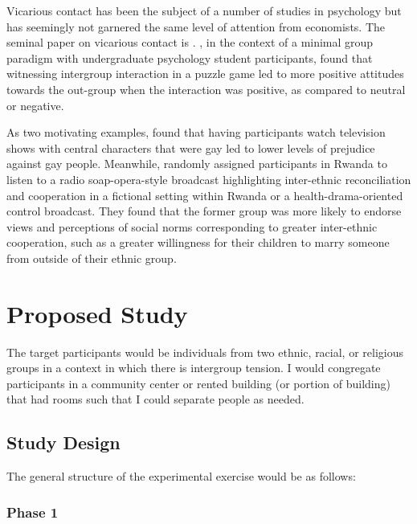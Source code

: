 \documentclass[10pt]{article}
\newif\ifdraft
\begin{document}
Vicarious contact has been the subject of a number of studies in psychology
but has seemingly not garnered the same level of attention from economists.
The seminal paper on vicarious contact is 
\ifdraft(wright1997) \else\textcite{wright1997} \fi.
\ifdraft(wright1997) \else\textcite{wright1997} \fi, in the context of 
a minimal group paradigm with undergraduate psychology student participants, 
found that witnessing intergroup interaction in a puzzle game 
led to more positive attitudes towards the out-group when 
the interaction was positive, as compared to neutral or negative.

As two motivating examples, \ifdraft(schiappa2005) \else\textcite{schiappa2005} \fi
found that having participants watch television shows
with central characters that were gay led to lower levels of prejudice
against gay people. Meanwhile, \ifdraft(paluck2009) \else\textcite{paluck2009} \fi
randomly assigned participants in Rwanda to listen to a 
radio soap-opera-style broadcast highlighting inter-ethnic 
reconciliation and cooperation 
in a fictional setting within Rwanda or a 
health-drama-oriented control broadcast.
They found that the former group was more likely to 
endorse views
and perceptions of social norms
corresponding to greater inter-ethnic cooperation, such 
as a greater willingness for their children to marry 
someone from outside of their ethnic group.

\section{Proposed Study}

The target participants would be 
individuals
from two ethnic, racial, or religious groups in a context in which
there is intergroup tension. I would congregate participants 
in a community center or rented building (or portion of building) that had rooms such 
that I could separate 
people as needed.


\subsection{Study Design}

The general structure of the experimental exercise would be as follows:

\subsubsection{Phase 1}
\end{document}
